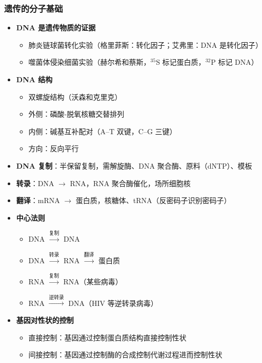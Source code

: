 \subsubsection{遗传的分子基础}

\begin{itemize}
  \item \textbf{DNA 是遗传物质的证据}
  \begin{itemize}
    \item 肺炎链球菌转化实验（格里菲斯：转化因子；艾弗里：DNA 是转化因子）
    \item 噬菌体侵染细菌实验（赫尔希和蔡斯，$^{35}$S 标记蛋白质，$^{32}$P 标记 DNA）
  \end{itemize}
  \item \textbf{DNA 结构}
  \begin{itemize}
    \item 双螺旋结构（沃森和克里克）
    \item 外侧：磷酸-脱氧核糖交替排列
    \item 内侧：碱基互补配对（A--T 双键，C--G 三键）
    \item 方向：反向平行
  \end{itemize}
  \item \textbf{DNA 复制}：半保留复制，需解旋酶、DNA 聚合酶、原料（dNTP）、模板
  \item \textbf{转录}：DNA $\to$ RNA，RNA 聚合酶催化，场所细胞核
  \item \textbf{翻译}：mRNA $\to$ 蛋白质，核糖体、tRNA（反密码子识别密码子）
  \item \textbf{中心法则}
  \begin{itemize}
    \item DNA $\xrightarrow{\text{复制}}$ DNA
    \item DNA $\xrightarrow{\text{转录}}$ RNA $\xrightarrow{\text{翻译}}$ 蛋白质
    \item RNA $\xrightarrow{\text{复制}}$ RNA（某些病毒）
    \item RNA $\xrightarrow{\text{逆转录}}$ DNA（HIV 等逆转录病毒）
  \end{itemize}
  \item \textbf{基因对性状的控制}
  \begin{itemize}
    \item 直接控制：基因通过控制蛋白质结构直接控制性状
    \item 间接控制：基因通过控制酶的合成控制代谢过程进而控制性状
  \end{itemize}
\end{itemize}

